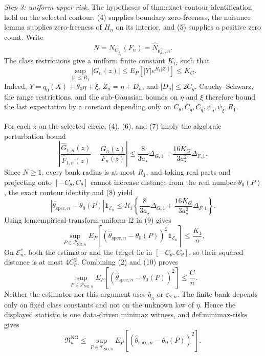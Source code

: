 \emph{Step 3: uniform upper risk.}
The hypotheses of \(\text{thm:exact-contour-identification}\) hold on the
selected contour: (4) supplies boundary zero-freeness, the nuisance lemma
supplies zero-freeness of \(H_n\) on its interior, and (5) supplies a
positive zero count.  Write
\[
 N=N_{C_{\widehat j_n}}(F_n)
   =\widehat N_{0\widehat j_n,n}.
\]
The class restrictions give a uniform finite constant \(K_G\) such that
\[
 \sup_{|z|\le R_1}|G_n(z)|
 \le E_P[|Y|e^{R_1|Z_n|}]
 \le K_G.                                               \tag{7}
\]
Indeed, \(Y=q_0(X)+\theta_0\eta+\xi\),
\(Z_n=\eta+D_n\), and \(|D_n|\le2C_g\).  Cauchy--Schwarz,
the range restrictions, and the sub-Gaussian bounds on \(\eta\) and
\(\xi\) therefore bound the last expectation by a constant depending
only on \(C_{\theta},C_g,C_q,\psi_{\eta},\psi_{\xi},R_1\).

For each \(z\) on the selected circle, (4), (6), and (7) imply the
algebraic perturbation bound
\[
 \left|
  \frac{\widehat G_{1,n}(z)}{\widehat F_{1,n}(z)}
  -\frac{G_n(z)}{F_n(z)}
 \right|
 \le
 \frac{8}{3a_{\star}}\Delta_{G,1}
 +\frac{16K_G}{3a_{\star}^2}\Delta_{F,1}.              \tag{8}
\]
Since \(N\ge1\), every bank radius is at most \(R_1\), and taking real
parts and projecting onto \([-C_{\theta},C_{\theta}]\) cannot increase
distance from the real number \(\theta_0(P)\), the exact contour identity
and (8) yield
\[
 |\widehat\theta_{\mathrm{spec},n}-\theta_0(P)|
 \mathbf 1_{\mathcal E_n}
 \le R_1\left\{
   \frac{8}{3a_{\star}}\Delta_{G,1}
   +\frac{16K_G}{3a_{\star}^2}\Delta_{F,1}
 \right\}.                                             \tag{9}
\]
Using \(\text{lem:empirical-transform-uniform-l2}\) in (9) gives
\[
 \sup_{P\in\mathcal P_{\mathrm{NG},n}}
 E_P\!\left[(\widehat\theta_{\mathrm{spec},n}-\theta_0(P))^2
      \mathbf 1_{\mathcal E_n}\right]
 \le\frac{K_1}{n}.                                     \tag{10}
\]
On \(\mathcal E_n^c\), both the estimator and the target lie in
\([-C_{\theta},C_{\theta}]\), so their squared distance is at most
\(4C_{\theta}^2\).  Combining (2) and (10) proves
\[
 \sup_{P\in\mathcal P_{\mathrm{NG},n}}
 E_P[(\widehat\theta_{\mathrm{spec},n}-\theta_0(P))^2]
 \le\frac Cn.                                          \tag{11}
\]
Neither the estimator nor this argument uses \(\bar q_n\) or
\(\varepsilon_{2,n}\).  The finite bank depends only on fixed class
constants and not on the unknown law of \(\eta\).  Hence the displayed
statistic is one data-driven minimax witness, and
\(\text{def:minimax-risks}\) gives
\[
 \mathfrak R_n^{\mathrm{NG}}
 \le
 \sup_{P\in\mathcal P_{\mathrm{NG},n}}
 E_P[(\widehat\theta_{\mathrm{spec},n}-\theta_0(P))^2]. \tag{12}
\]

